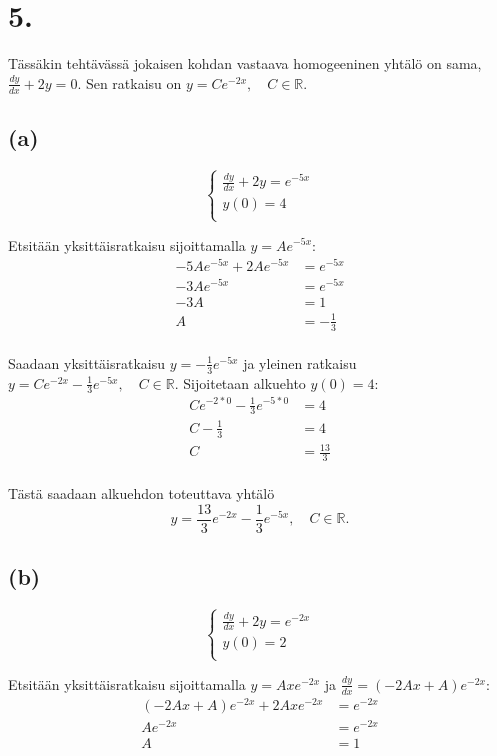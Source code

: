 \documentclass{article}
\begin{document}
\section*{5.}

Tässäkin tehtävässä jokaisen kohdan vastaava homogeeninen yhtälö on sama,
$\frac{dy}{dx} + 2y = 0$.  Sen ratkaisu on $y = Ce^{-2x}, \quad C \in \mathbb{R}$.

\subsection*{(a)}

\[
  \begin{cases}
    \frac{dy}{dx} + 2y = e^{-5x} \\
    y(0) = 4 \\
  \end{cases}
\]

Etsitään yksittäisratkaisu sijoittamalla $y = Ae^{-5x}$:
\begin{align*}
  -5Ae^{-5x} + 2Ae^{-5x} &= e^{-5x} \\
  -3Ae^{-5x} &= e^{-5x} \\
  -3A &= 1 \\
  A &= -\frac{1}{3} \\
\end{align*}

Saadaan yksittäisratkaisu $y = -\frac{1}{3}e^{-5x}$ ja yleinen ratkaisu
$y = Ce^{-2x} - \frac{1}{3}e^{-5x}, \quad C \in \mathbb{R}$.
Sijoitetaan alkuehto $y(0) = 4$:
\begin{align*}
  Ce^{-2*0} - \frac{1}{3}e^{-5*0} &= 4 \\
  C - \frac{1}{3} &= 4 \\
  C &= \frac{13}{3} \\
\end{align*}

Tästä saadaan alkuehdon toteuttava yhtälö
\[
  y = \frac{13}{3}e^{-2x} - \frac{1}{3}e^{-5x}, \quad C \in \mathbb{R}.
\]

\subsection*{(b)}

\[
  \begin{cases}
    \frac{dy}{dx} + 2y = e^{-2x} \\
    y(0) = 2 \\
  \end{cases}
\]

Etsitään yksittäisratkaisu sijoittamalla $y = Axe^{-2x}$ ja
$\frac{dy}{dx} = (-2Ax + A)e^{-2x}$:
\begin{align*}
  (-2Ax + A)e^{-2x} + 2Axe^{-2x} &= e^{-2x} \\
  Ae^{-2x} &= e^{-2x} \\
  A &= 1 \\
\end{align*}
\end{document}
